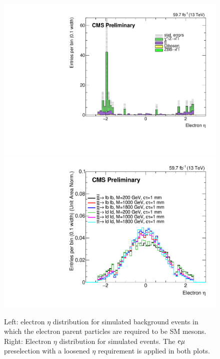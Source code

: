 \begin{figure}[hbtp]
\centering
\includegraphics[scale=0.3]{figures/large_eta/electronEtaBkgLightMesons.pdf}
\includegraphics[scale=0.27]{figures/large_eta/electronEtaSignal.pdf}
\caption{Left: electron $\eta$ distribution for simulated background events in which the electron parent particles are required to be SM mesons. Right: Electron $\eta$ distribution for simulated \stoptolb events. The $\mathrm{e}{\mu}$ preselection with a loosened $\eta$ requirement is applied in both plots.}
\label{large_eta_e}
\end{figure}